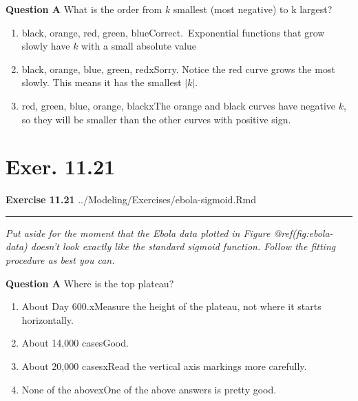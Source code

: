 \documentclass[
  letterpaper,
  DIV=11,
  numbers=noendperiod,
  oneside]{article}
\providecommand{\tightlist}{%
  \setlength{\itemsep}{0pt}\setlength{\parskip}{0pt}}\usepackage{longtable,booktabs,array}
\begin{document}
\begin{multicols}{2}
\textbf{Question A} What is the order from \(k\) smallest (most
negative) to k largest?

\begin{enumerate}
\def\labelenumi{\roman{enumi}.}
\tightlist
\item
  {black, orange, red, green, blue{Correct.~Exponential functions that
  grow slowly have \(k\) with a small absolute value}}\\
\item
  {black, orange, blue, green, red{xSorry. Notice the red curve grows
  the most slowly. This means it has the smallest \(|k|\).}}\\
\item
  {red, green, blue, orange, black{xThe orange and black curves have
  negative \(k\), so they will be smaller than the other curves with
  positive sign.}}
\end{enumerate}

\hypertarget{exer.-11.21}{%
\section*{Exer. 11.21}\label{exer.-11.21}}

\textbf{Exercise 11.21} ../Modeling/Exercises/ebola-sigmoid.Rmd

\begin{center}\rule{0.5\linewidth}{0.5pt}\end{center}

\emph{Put aside for the moment that the Ebola data plotted in Figure
@ref(fig:ebola-data) doesn't look exactly like the standard sigmoid
function. Follow the fitting procedure as best you can.}

\textbf{Question A} Where is the top plateau?

\begin{enumerate}
\def\labelenumi{\roman{enumi}.}
\tightlist
\item
  {About Day 600.{xMeasure the height of the plateau, not where it
  starts horizontally.}}\\
\item
  {About 14,000 cases{Good.~}}\\
\item
  {About 20,000 cases{xRead the vertical axis markings more
  carefully.}}\\
\item
  {None of the above{xOne of the above answers is pretty good.}}
\end{enumerate}


\end{multicols}
\end{document}

